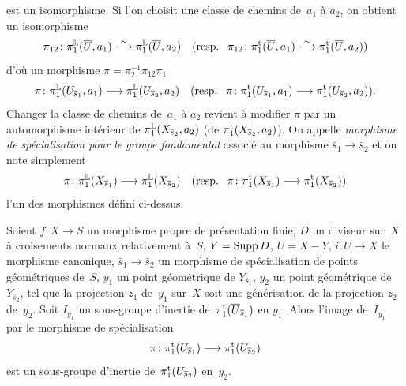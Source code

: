 est un isomorphisme. Si l'on choisit une classe de chemins de~$a_1$
\`a $a_2$, on obtient un isomorphisme
$$
\pi_{12}\colon \pi_1^{\mathbb{L}}(\overline{U},a_1)\overset{\sim}{\longrightarrow}
\pi_1^{\mathbb{L}}(\overline{U},a_2) \quad (\text{resp.\space~} \pi_{12}\colon
\pi_1^{\mathrm{t}} (\overline{U},a_1)\overset{\sim}{\longrightarrow} \pi_1^{\mathrm{t}}(\overline{U},a_2))
$$
d'o\`u un morphisme $\pi=\pi_2^{-1}\pi_{12}\pi_1$
$$
\pi\colon \pi_1^{\LL}(U_{\bar{s}_1},a_1)\to
\pi_1^{\LL}(U_{\bar{s}_2},a_2) \quad (\text{\resp~}\pi\colon
\pi_1^\tame (U_{\bar{s}_1},a_1)\to \pi_1^\tame
(U_{\bar{s}_2},a_2)).
$$
Changer la classe de chemins de~$a_1$ \`a $a_2$ revient \`a
modifier $\pi$ par un automorphisme int\'erieur de
$\pi_1^{\mathbb{L}}(X_{\overline{s}_2},a_2)$ (\resp de
$\pi_1^{\mathrm{t}}(X_{\overline{s}_2},a_2)$). On appelle \emph{morphisme de
spécialisation pour le groupe fondamental}
associ\'e au morphisme $\bar{s}_1\to \bar{s}_2$ et on note
simplement
$$
\pi\colon \pi_1^{\LL}(X_{\bar{s}_1})\to
\pi_1^{\LL}(X_{\bar{s}_2}) \quad \text{(\resp~} \pi\colon
\pi_1^{\tame}(X_{\bar{s}_1})\to \pi_1^{\tame}(X_{\bar{s}_2}))
$$
l'un des morphismes d\'efini ci-dessus.

\begin{lemme}
\label{XIII.2.11}
Soient $f\colon X\to S$ un morphisme propre de
pr\'esentation finie, $D$ un diviseur sur~$X$ \`a croisements
normaux relativement \`a~$S$, $Y=\operatorname{Supp} D$, $U=X-Y$, $i\colon
U\to X$ le morphisme canonique, $\bar{s}_1\to
\bar{s}_2$ un morphisme de sp\'ecialisation de points
g\'eom\'etriques de~$S$, $y_1$ un point g\'eom\'etrique de
$Y_{\bar{s}_1}$, $y_2$ un point g\'eom\'etrique de
$Y_{\bar{s}_2}$, tel que la projection $z_1$ de~$y_1$ sur~$X$ soit une
g\'en\'erisation de la projection $z_2$ de~$y_2$. Soit $I_{y_1}$
un sous-groupe d'inertie de~$\pi_1^{\mathrm{t}}(\overline{U}_{\overline{s}_1})$ en
$y_1.$ Alors l'image de~$I_{y_{1}}$ par le morphisme de
sp\'ecialisation
$$
\pi\colon \pi_1^{\tame}(U_{\bar{s}_1})\to
\pi_1^{\tame}(U_{\bar{s}_2})
$$
est
un sous-groupe d'inertie de~$\pi_1^{\mathrm{t}}(U_{\overline{s}_2})$
en~$y_2$.
\end{lemme}

